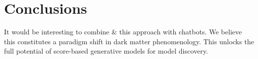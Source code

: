 \section{Conclusions}\label{sec:conclusions}

It would be interesting to combine & this approach with chatbots. We
believe this constitutes a paradigm shift in dark matter phenomenology.
This unlocks the full potential of score-based generative models for
model discovery.

